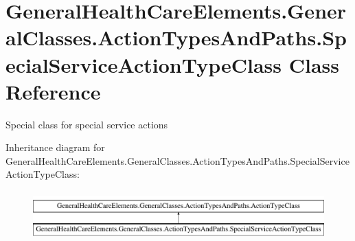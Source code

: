 \hypertarget{class_general_health_care_elements_1_1_general_classes_1_1_action_types_and_paths_1_1_special_service_action_type_class}{}\section{General\+Health\+Care\+Elements.\+General\+Classes.\+Action\+Types\+And\+Paths.\+Special\+Service\+Action\+Type\+Class Class Reference}
\label{class_general_health_care_elements_1_1_general_classes_1_1_action_types_and_paths_1_1_special_service_action_type_class}


Special class for special service actions  


Inheritance diagram for General\+Health\+Care\+Elements.\+General\+Classes.\+Action\+Types\+And\+Paths.\+Special\+Service\+Action\+Type\+Class\+:\begin{figure}[H]
\begin{center}
\leavevmode
\includegraphics[height=1.914530cm]{class_general_health_care_elements_1_1_general_classes_1_1_action_types_and_paths_1_1_special_service_action_type_class}
\end{center}
\end{figure}
